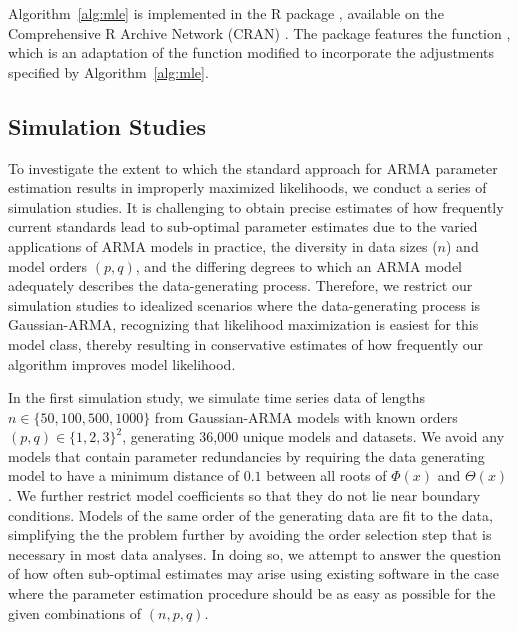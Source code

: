 Algorithm~\ref{alg:mle} is implemented in the R package , available on the Comprehensive R Archive Network (CRAN) \cite{arima2Cran}.
The package features the function , which is an adaptation of the  function modified to incorporate the adjustments specified by Algorithm~\ref{alg:mle}.

\subsection{Simulation Studies}\label{sec:sims}



To investigate the extent to which the standard approach for ARMA parameter estimation results in improperly maximized likelihoods, we conduct a series of simulation studies.
It is challenging to obtain precise estimates of how frequently current standards lead to sub-optimal parameter estimates due to the varied applications of ARMA models in practice, the diversity in data sizes ($n$) and model orders $(p, q)$, and the differing degrees to which an ARMA model adequately describes the data-generating process.
Therefore, we restrict our simulation studies to idealized scenarios where the data-generating process is Gaussian-ARMA, recognizing that likelihood maximization is easiest for this model class, thereby resulting in conservative estimates of how frequently our algorithm improves model likelihood.

In the first simulation study, we simulate time series data of lengths $n \in \{50, 100, 500, 1000\}$ from Gaussian-ARMA models with known orders $(p, q) \in \{1, 2, 3\}^2$, generating 36,000 unique models and datasets.
We avoid any models that contain parameter redundancies by requiring the data generating model to have a minimum distance of $0.1$ between all roots of $\Phi(x)$ and $\Theta(x)$.
We further restrict model coefficients so that they do not lie near boundary conditions.
Models of the same order of the generating data are fit to the data, simplifying the the problem further by avoiding the order selection step that is necessary in most data analyses.
In doing so, we attempt to answer the question of how often sub-optimal estimates may arise using existing software in the case where the parameter estimation procedure should be as easy as possible for the given combinations of $(n, p, q)$.

